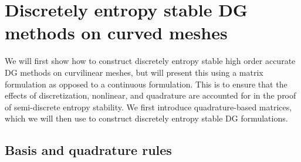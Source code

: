 \documentclass[10pt]{amsart}
\theoremstyle{definition}
\theoremstyle{lemma}
\theoremstyle{theorem}
\theoremstyle{assumption}
\begin{document}
\section{Discretely entropy stable DG methods on curved meshes}
\label{sec:2}
We will first show how to construct discretely entropy stable high order accurate DG methods on curvilinear meshes, but will present this using a matrix formulation as opposed to a continuous formulation.  This is to ensure that the effects of discretization, nonlinear, and quadrature are accounted for in the proof of semi-discrete entropy stability.  We first introduce quadrature-based matrices, which we will then use to construct discretely entropy stable DG formulations.


\subsection{Basis and quadrature rules}
\end{document}
